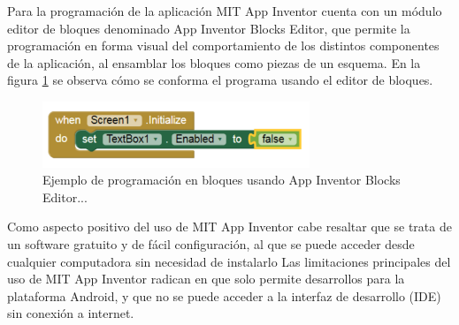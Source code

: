 Para la programación de la aplicación MIT App Inventor cuenta con un módulo editor de bloques denominado App Inventor Blocks Editor, que permite la programación en forma visual del comportamiento de los distintos  componentes de la aplicación, al ensamblar los bloques como piezas de un esquema. En la figura \ref{fig:mitappblock} se observa cómo se conforma el programa usando el editor de bloques.


\begin{figure}[h]
	\centering
	\includegraphics[width=8cm]{./Figures/mitblock.PNG}
	\caption{Ejemplo de programación en bloques usando App Inventor Blocks Editor.\protect\footnotemark..}
	\label{fig:mitappblock}
\end{figure}


Como aspecto positivo del uso de MIT App Inventor cabe resaltar que se trata de un software gratuito y de fácil configuración, al que se puede acceder desde cualquier computadora sin necesidad de instalarlo
Las limitaciones principales del uso de MIT App Inventor radican en que solo permite desarrollos para la plataforma Android, y que no se puede acceder a la interfaz de desarrollo (IDE) sin conexión a internet.


